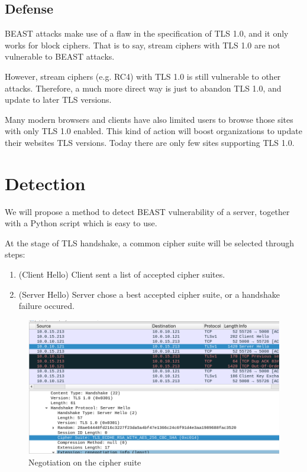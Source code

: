 \documentclass{acm_proc_article-sp}
\begin{document}
\subsection{}

\subsection{Defense}
BEAST attacks make use of a flaw in the specification of TLS 1.0, and it only
works for block ciphers. That is to say, stream ciphers with TLS 1.0 are not
vulnerable to BEAST attacks.

However, stream ciphers (e.g. RC4) with TLS 1.0 is still vulnerable to other attacks.
Therefore, a much more direct way is just to abandon TLS 1.0, and update to later TLS
versions.

Many modern browsers and clients have also limited users to browse those sites
with only TLS 1.0 enabled. This kind of action will boost organizations to update their
websites TLS versions. Today there are only few sites supporting TLS 1.0.

\section{Detection}

We will propose a method to detect BEAST vulnerability of a server, together with a
Python script which is easy to use.

At the stage of TLS handshake, a common cipher suite will be selected through steps:

\begin{enumerate}
    \item (Client Hello) Client sent a list of accepted cipher suites.
    \item (Server Hello) Server chose a best accepted cipher suite, or a handshake failure occured.
\end{enumerate}

\begin{figure}[htb]
    \centering
    \includegraphics[keepaspectratio, width=\linewidth]{./figures/tls-handshake-cipher-spec.png}
    \caption{Negotiation on the cipher suite}
\end{figure}
\end{document}
